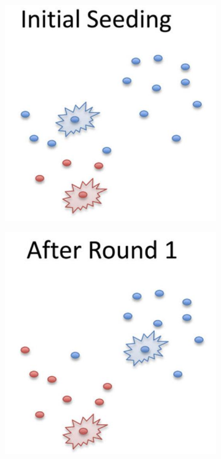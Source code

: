 \documentclass[
	number={6},
	title={Clustering}
]{cs584notes}
\begin{document}
\begin{figure}[H]
	\centering
	\begin{subfigure}[m]{0.24\textwidth}
		\centering
		\includegraphics[width=\textwidth]{figures/6/k_means_example_0}
	\end{subfigure}
	\begin{subfigure}[m]{0.24\textwidth}
		\centering
		\includegraphics[width=\textwidth]{figures/6/k_means_example_1}

\end{subfigure}
\end{figure}
\end{document}
